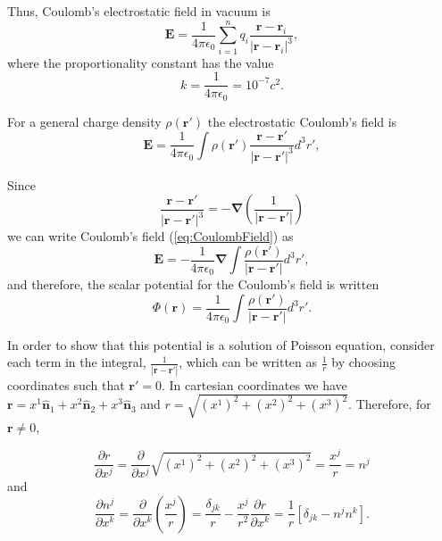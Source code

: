 Thus, Coulomb's electrostatic field in vacuum is
\begin{equation}
\textbf{E} = \frac{1}{4\pi \epsilon_0}  \sum_{i=1}^n  q_i \frac{\textbf{r} - \textbf{r}_i}{\left| \textbf{r} - \textbf{r}_i \right| ^3},
\end{equation}
where the proportionality constant has the value
\begin{equation}
k = \frac{1}{4\pi \epsilon_0} = 10^{-7} c^2 .
\end{equation}

For a general charge density $\rho(\textbf{r}')$ the electrostatic Coulomb's field is 
\begin{equation}
\textbf{E} = \frac{1}{4\pi \epsilon_0}  \int  \rho (\textbf{r}') \frac{\textbf{r} - \textbf{r}'}{\left| \textbf{r} - \textbf{r}' \right| ^3} d^3r', \label{eq:CoulombField}
\end{equation}


Since 
\begin{equation}
\frac{\textbf{r} - \textbf{r}'}{\left| \textbf{r} - \textbf{r}' \right| ^3}  = - \boldsymbol{\nabla} \left( \frac{1}{\left| \textbf{r} - \textbf{r}' \right| }  \right)
\end{equation}
we can write Coulomb's field (\ref{eq:CoulombField}) as
\begin{equation}
\textbf{E} = - \frac{1}{4\pi \epsilon_0} \boldsymbol{\nabla}  \int   \frac{\rho (\textbf{r}') }{\left| \textbf{r} - \textbf{r}' \right| }  d^3r',
\end{equation}
and therefore, the scalar potential for the Coulomb's field is written
\begin{equation}
\Phi (\textbf{r}) =  \frac{1}{4\pi \epsilon_0}  \int   \frac{\rho (\textbf{r}') }{\left| \textbf{r} - \textbf{r}' \right| }  d^3r'.
\label{eq:CoulombPotential}
\end{equation}

In order to show that this potential is a solution of Poisson equation, consider each term in the integral, $  \frac{1}{\left| \textbf{r} - \textbf{r}' \right| }$, which can be written as $\frac{1}{r}$ by choosing coordinates such that $\textbf{r}' = 0$. In cartesian coordinates we have $\textbf{r}= x^1 \hat{\textbf{n}}_1 + x^2 \hat{\textbf{n}}_2 + x^3 \hat{\textbf{n}}_3 $ and $r = \sqrt{(x^1)^2 + (x^2)^2 + (x^3)^2}$. Therefore, for $\textbf{r} \neq 0 $, 

\begin{equation}
\frac{\partial r}{\partial x^j} = \frac{\partial }{\partial x^j} \sqrt{(x^1)^2 + (x^2)^2 + (x^3)^2} = \frac{x^j}{r} = n^j
\end{equation}
and 
\begin{equation}
\frac{\partial n^j }{\partial x^k} = \frac{\partial }{\partial x^k} \left( \frac{x^j}{r}\right) = \frac{\delta_{jk}}{r} -\frac{x^j}{r^2} \frac{\partial r}{\partial x^k} = \frac{1}{r}\left[ \delta_{jk} -n^j n^k \right].
\end{equation}


